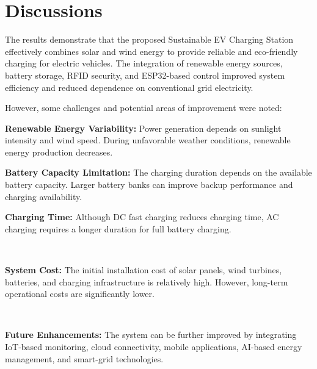 \documentclass[12pt]{report}
\begin{document}
\begin{Certificatepage}
\begin{center}
\begin{justify}
\begin{figure}[h!]
\vspace{10pt}
\par
\end{figure}
\clearpage

\section{Discussions}
\label{dis}
\vspace{10pt}
\par
The results demonstrate that the proposed Sustainable EV Charging Station effectively combines solar and wind energy to provide reliable and eco-friendly charging for electric vehicles. The integration of renewable energy sources, battery storage, RFID security, and ESP32-based control improved system efficiency and reduced dependence on conventional grid electricity.

\vspace{10pt} 
\par
However, some challenges and potential areas of improvement were noted:

\vspace{10pt}
\par 
\textbf{Renewable Energy Variability:} Power generation depends on sunlight intensity and wind speed. During unfavorable weather conditions, renewable energy production decreases.

\vspace{10pt} 
\par 
\textbf{Battery Capacity Limitation}\textbf{:} The charging duration depends on the available battery capacity. Larger battery banks can improve backup performance and charging availability.

\vspace{10pt}
\par
\textbf{Charging Time:} Although DC fast charging reduces charging time, AC charging requires a longer duration for full battery charging.

\vspace{10pt} \\
\par
\textbf{System Cost:} The initial installation cost of solar panels, wind turbines, batteries, and charging infrastructure is relatively high. However, long-term operational costs are significantly lower.

\vspace{10pt} \\
\par
\textbf{Future Enhancements:} The system can be further improved by integrating IoT-based monitoring, cloud connectivity, mobile applications, AI-based energy management, and smart-grid technologies.


\end{justify}
\end{center}
\end{Certificatepage}
\end{document}
